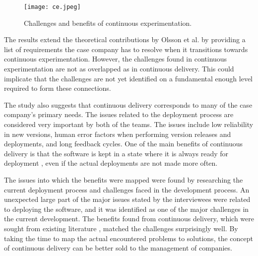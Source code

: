 \documentclass[english]{tktltiki2}
\theoremstyle{definition}
\theoremstyle{remark}
\begin{document}
\begin{figure}[!htb]
	\centering
	\texttt{[image: ce.jpeg]}
	\caption{Challenges and benefits of continuous experimentation.}
	\label{fig9}
\end{figure}

The results extend the theoretical contributions by Olsson et al. \cite{olsson2012climbing} by providing a list of requirements the case company has to resolve when it transitions towards continuous experimentation. However, the challenges found in continuous experimentation are not as overlapped as in continuous delivery. This could implicate that the challenges are not yet identified on a fundamental enough level required to form these connections.








The study also suggests that continuous delivery corresponds to many of the case company's primary needs. The issues related to the deployment process are considered very important by both of the teams. The issues include low reliability in new versions, human error factors when performing version releases and deployments, and long feedback cycles. One of the main benefits of continuous delivery is that the software is kept in a state where it is always ready for deployment \cite{cdbook}, even if the actual deployments are not made more often. 

The issues into which the benefits were mapped were found by researching the current deployment process and challenges faced in the development process. An unexpected large part of the major issues stated by the interviewees were related to deploying the software, and it was identified as one of the major challenges in the current development. The benefits found from continuous delivery, which were sought from existing literature \cite{cdbook, neely2013continuous}, matched the challenges surprisingly well. By taking the time to map the actual encountered problems to solutions, the concept of continuous delivery can be better sold to the management of companies.
\end{document}
